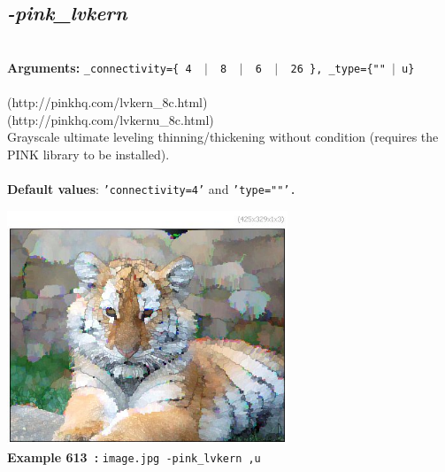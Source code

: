 \documentclass[a4paper,11pt,twoside]{book}
\begin{document}
\subsection{\emph{-pink\_lvkern} }\vspace*{-0.5em}
~\\\textbf{Arguments: } 
{\small \texttt{\_connectivity=\{ 4 ~$|$~ 8 ~$|$~ 6 ~$|$~ 26 \}, \_type=\{""~$|$~u\}}}\\~\\
(http://pinkhq.com/lvkern\_8c.html)
~\\(http://pinkhq.com/lvkernu\_8c.html)
~\\Grayscale ultimate leveling thinning/thickening without condition (requires the PINK library to be installed).
~\\~\\\textbf{Default values}: {\small \texttt{'connectivity=4'} and \texttt{'type=""'.}}
\begin{center}\includegraphics[keepaspectratio=true,height=7cm,width=\textwidth]{img/gmic_def613.jpg}\\
{\footnotesize \textbf{Example 613~:} \texttt{image.jpg -pink\_lvkern ,u}}
\end{center}
\end{document}
